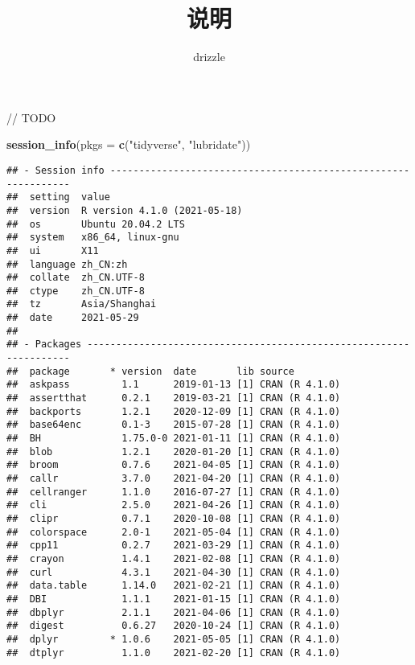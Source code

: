 \documentclass[]{ctexart}
\title{说明}
\author{drizzle}
\date{}
\newenvironment{Shaded}{\begin{snugshade}}{\end{snugshade}}
\newcommand{\DataTypeTok}[1]{\textcolor[rgb]{0.13,0.29,0.53}{#1}}
\newcommand{\KeywordTok}[1]{\textcolor[rgb]{0.13,0.29,0.53}{\textbf{#1}}}
\newcommand{\NormalTok}[1]{#1}
\newcommand{\StringTok}[1]{\textcolor[rgb]{0.31,0.60,0.02}{#1}}
\begin{document}
\maketitle

// TODO

\begin{Shaded}
\begin{Highlighting}[]
\KeywordTok{session_info}\NormalTok{(}\DataTypeTok{pkgs =} \KeywordTok{c}\NormalTok{(}\StringTok{"tidyverse"}\NormalTok{, }\StringTok{"lubridate"}\NormalTok{))}
\end{Highlighting}
\end{Shaded}

\begin{verbatim}
## - Session info ---------------------------------------------------------------
##  setting  value                       
##  version  R version 4.1.0 (2021-05-18)
##  os       Ubuntu 20.04.2 LTS          
##  system   x86_64, linux-gnu           
##  ui       X11                         
##  language zh_CN:zh                    
##  collate  zh_CN.UTF-8                 
##  ctype    zh_CN.UTF-8                 
##  tz       Asia/Shanghai               
##  date     2021-05-29                  
## 
## - Packages -------------------------------------------------------------------
##  package       * version  date       lib source        
##  askpass         1.1      2019-01-13 [1] CRAN (R 4.1.0)
##  assertthat      0.2.1    2019-03-21 [1] CRAN (R 4.1.0)
##  backports       1.2.1    2020-12-09 [1] CRAN (R 4.1.0)
##  base64enc       0.1-3    2015-07-28 [1] CRAN (R 4.1.0)
##  BH              1.75.0-0 2021-01-11 [1] CRAN (R 4.1.0)
##  blob            1.2.1    2020-01-20 [1] CRAN (R 4.1.0)
##  broom           0.7.6    2021-04-05 [1] CRAN (R 4.1.0)
##  callr           3.7.0    2021-04-20 [1] CRAN (R 4.1.0)
##  cellranger      1.1.0    2016-07-27 [1] CRAN (R 4.1.0)
##  cli             2.5.0    2021-04-26 [1] CRAN (R 4.1.0)
##  clipr           0.7.1    2020-10-08 [1] CRAN (R 4.1.0)
##  colorspace      2.0-1    2021-05-04 [1] CRAN (R 4.1.0)
##  cpp11           0.2.7    2021-03-29 [1] CRAN (R 4.1.0)
##  crayon          1.4.1    2021-02-08 [1] CRAN (R 4.1.0)
##  curl            4.3.1    2021-04-30 [1] CRAN (R 4.1.0)
##  data.table      1.14.0   2021-02-21 [1] CRAN (R 4.1.0)
##  DBI             1.1.1    2021-01-15 [1] CRAN (R 4.1.0)
##  dbplyr          2.1.1    2021-04-06 [1] CRAN (R 4.1.0)
##  digest          0.6.27   2020-10-24 [1] CRAN (R 4.1.0)
##  dplyr         * 1.0.6    2021-05-05 [1] CRAN (R 4.1.0)
##  dtplyr          1.1.0    2021-02-20 [1] CRAN (R 4.1.0)

\end{verbatim}
\end{document}
